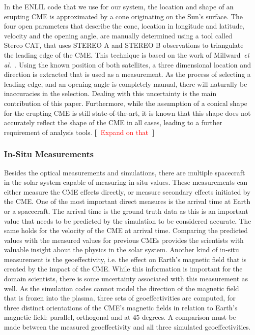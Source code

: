 \documentclass[journal]{vgtc}                %
\def\etal{\textit{et al.}}
\newcommand{\todo}[1] {\textbf{[~}\textcolor {red}{#1}\marginpar{\textcolor {red}{\centerline{{\Huge \textbf{!}}}}}\textbf{~]}}
\def\etal{\textit{et al.}}
\newcommand{\todo}[1] {\textbf{[~}\textcolor {red}{#1}\marginpar{\textcolor {red}{\centerline{{\Huge \textbf{!}}}}}\textbf{~]}}
\begin{document}
In the ENLIL code that we use for our system, the location and shape of an erupting CME is approximated by a cone originating on the Sun's surface. The four open parameters that describe the cone, location in longitude and latitude, velocity and the opening angle, are manually determined using a tool called Stereo CAT, that uses STEREO A and STEREO B observations to triangulate the leading edge of the CME. This technique is based on the work of Millward~\etal~\cite{Millward:2013cm}. Using the known position of both satellites, a three dimensional location and direction is extracted that is used as a measurement. As the process of selecting a leading edge, and an opening angle is completely manual, there will naturally be inaccuracies in the selection. Dealing with this uncertainty is the main contribution of this paper. Furthermore, while the assumption of a conical shape for the erupting CME is still state-of-the-art, it is known that this shape does not accurately reflect the shape of the CME in all cases, leading to a further requirement of analysis tools. \todo{Expand on that}

\subsubsection{In-Situ Measurements} \label{sec:insitu}
Besides the optical measurements and simulations, there are multiple spacecraft in the solar system capable of measuring in-situ values. These measurements can either measure the CME effects directly, or measure secondary effects initiated by the CME. One of the most important direct measures is the arrival time at Earth or a spacecraft. The arrival time is the ground truth data as this is an important value that needs to be predicted by the simulation to be considered accurate. The same holds for the velocity of the CME at arrival time. Comparing the predicted values with the measured values for previous CMEs provides the scientists with valuable insight about the physics in the solar system. Another kind of in-situ measurement is the geoeffectivity, i.e. the effect on Earth's magnetic field that is created by the impact of the CME. While this information is important for the domain scientists, there is some uncertainty associated with this measurement as well. As the simulation codes cannot model the direction of the magnetic field that is frozen into the plasma, three sets of geoeffectivities are computed, for three distinct orientations of the CME's magnetic fields in relation to Earth's magnetic field:  parallel, orthogonal and at 45 degrees. A comparison must be made between the measured geoeffectivity and all three simulated geoeffectivities.
\end{document}
